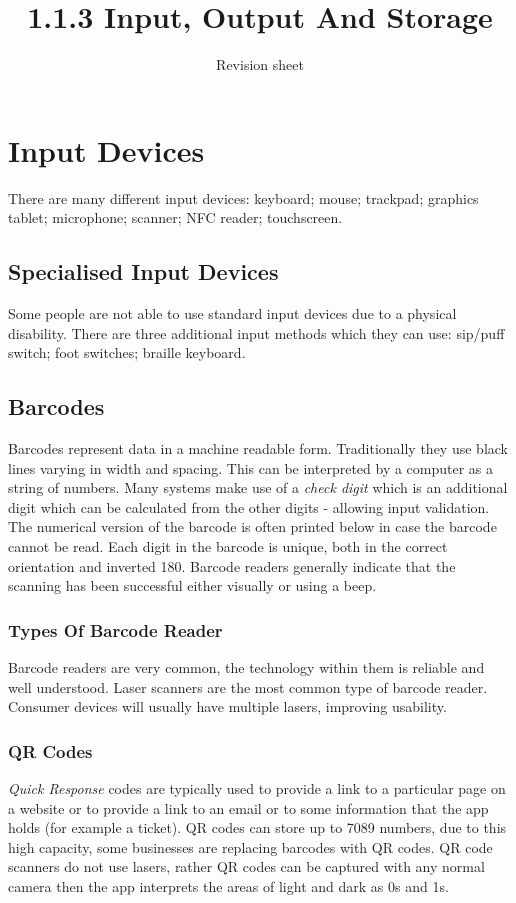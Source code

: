 \documentclass[a4paper,11pt, twocolumn]{article}
\title{1.1.3 Input, Output And Storage}
\author{Revision sheet}
\date{}
\begin{document}
\maketitle
\thispagestyle{fancy}

\section{Input Devices}
There are many different input devices: keyboard; mouse; trackpad; graphics tablet; microphone; scanner; NFC reader; touchscreen.
\subsection{Specialised Input Devices}
Some people are not able to use standard input devices due to a physical disability. There are three additional input methods which they can use: sip/puff switch; foot switches; braille keyboard.
\subsection{Barcodes}
Barcodes represent data in a machine readable form. Traditionally they use black lines varying in width and spacing. This can be interpreted by a computer as a string of numbers. Many systems make use of a \textit{check digit} which is an additional digit which can be calculated from the other digits - allowing input validation. The numerical version of the barcode is often printed below in case the barcode cannot be read. Each digit in the barcode is unique, both in the correct orientation and inverted 180\textdegree. Barcode readers generally indicate that the scanning has been successful either visually or using a beep.
\subsubsection{Types Of Barcode Reader}
Barcode readers are very common, the technology within them is reliable and well understood. Laser scanners are the most common type of barcode reader. Consumer devices will usually have multiple lasers, improving usability.
\subsubsection{QR Codes}
\textit{Quick Response} codes are typically used to provide a link to a particular page on a website or to provide a link to an email or to some information that the app holds (for example a ticket). QR codes can store up to 7089 numbers, due to this high capacity, some businesses are replacing barcodes with QR codes. QR code scanners do not use lasers, rather QR codes can be captured with any normal camera then the app interprets the areas of light and dark as 0s and 1s. 
\end{document}
